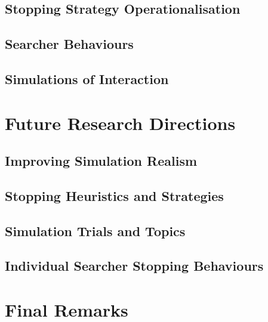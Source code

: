 \subsection{Stopping Strategy Operationalisation}

\subsection{Searcher Behaviours}

\subsection{Simulations of Interaction}

\section{Future Research Directions}\label{sec:conclusions:future}

\subsection{Improving Simulation Realism}\label{sec:conclusions:future:improving}

\subsection{Stopping Heuristics and Strategies}\label{sec:conclusions:future:stopping}

\subsection{Simulation Trials and Topics}\label{sec:conclusions:future:running}

\subsection{Individual Searcher Stopping Behaviours}

\section{Final Remarks}\label{sec:conclusions:remarks}